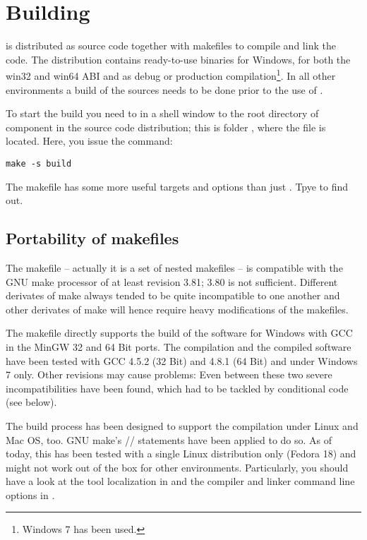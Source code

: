 \chapter{Building \linnet{}}
\label{secBuildingLinNet}

\linnet{} is distributed as source code together with makefiles to compile
and link the code. The distribution contains ready-to-use binaries for
Windows, for both the win32 and win64 ABI and as debug or production
compilation\footnote{Windows 7 has been used.}. In all other environments
a build of the sources needs to be done prior to the use of \linnet{}.

To start the build you need to  in a shell window to the root
directory of component  in the source code distribution; this
is folder , where the file  is
located. Here, you issue the command:
\begin{verbatim}
make -s build
\end{verbatim}
The makefile has some more useful targets and options than just
. Tpye  to find out.


\section{Portability of makefiles}

The makefile -- actually it is a set of nested makefiles -- is compatible
with the GNU make processor of at least revision 3.81; 3.80 is not
sufficient. Different derivates of make always tended to be quite
incompatible to one another and other derivates of make will hence require
heavy modifications of the makefiles.

The makefile directly supports the build of the software for Windows with
GCC in the MinGW 32 and 64 Bit ports. The compilation and the compiled
software have been tested with GCC 4.5.2 (32 Bit) and 4.8.1 (64 Bit) and
under Windows 7 only. Other revisions may cause problems: Even between
these two severe incompatibilities have been found, which had to be
tackled by conditional code (see below).

The build process has been designed to support the compilation under Linux
and Mac OS, too. GNU make's // statements
have been applied to do so. As of today, this has been tested with a
single Linux distribution only (Fedora 18) and might not work out of the
box for other environments. Particularly, you should have a look at the
tool localization in  and the compiler and linker
command line options in .

